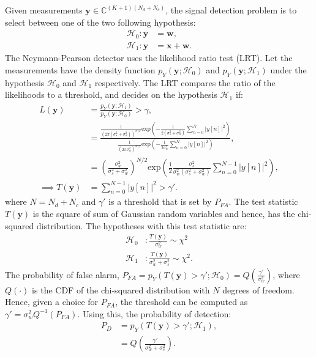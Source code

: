 \documentclass[11pt]{article}
\newcommand{\by}{\mathbf{y}}
\newcommand{\bx}{\mathbf{x}}
\newcommand{\bw}{\mathbf{w}}
\newcommand{\cc}{\mathbb{C}}
\newcommand{\cH}{\mathcal{H}}
\begin{document}
Given measurements $\by \in \cc^{(K+1)(N_{d}+N_{c})}$, the signal detection problem is to select between one of the two following hypothesis:
\begin{equation}
\begin{split}
	\mathcal{H}_{0}: \by &= \bw, \\
	\mathcal{H}_{1}: \by &= \bx + \bw.
\end{split}
\label{eq:detectionProblem}
\end{equation}
The Neymann-Pearson detector uses the likelihood ratio test (LRT). Let the measurements have the density function $p_{Y}(\by ; \cH_{0})$ and $p_{Y}(\by ; \cH_{1})$ under the hypothesis $\cH_{0}$ and $\cH_{1}$ respectively. The LRT compares the ratio of the likelihoods to a threshold, and decides on the hypothesis $\cH_{1}$ if:
\begin{equation}
\begin{split}
L(\by) &= \frac{p_{Y}(\by ; \cH_{1})}{p_{Y}(\by ; \cH_{0})} > \gamma, \\
&= \frac{\frac{1}{(2\pi(\sigma_{s}^{2} + \sigma_{w}^{2}))^{N/2}} \mathrm{exp}\left(-\frac{1}{2(\sigma_{s}^{2}+\sigma_{w}^{2})} \sum_{n=0}^{N}\vert y[n] \vert^{2} \right)}{\frac{1}{(2\pi\sigma_{w}^{2})^{N/2}} \mathrm{exp}\left(-\frac{1}{2\sigma_{w}^{2}} \sum_{n=0}^{N}\vert y[n] \vert^{2} \right)}, \\
&= \left(\frac{\sigma_{w}^{2}}{\sigma_{s}^{2}+\sigma_{w}^{2}}\right)^{N/2} \mathrm{exp} \left( \frac{1}{2} \frac{\sigma_{s}^{2}}{\sigma_{w}^{2}(\sigma_{s}^{2}+\sigma_{w}^{2})} \sum_{n=0}^{N-1} \vert y[n] \vert^{2} \right), \\
\implies T(\by) &= \sum_{n=0}^{N-1} \vert y[n] \vert^{2} > \gamma'.
\end{split}
\label{eq:energyLRT}
\end{equation}
where $N = N_{d}+N_{c}$ and $\gamma'$ is a threshold that is set by $P_{FA}$. The test statistic $T(\by)$ is the square of sum of Gaussian random variables and hence, has the chi-squared distribution. The hypotheses with this test statistic are:
\begin{equation}
\begin{split}
	\mathcal{H}_{0}&: \frac{T(\by)}{\sigma_{w}^{2}} \sim \chi^{2} \\
	\mathcal{H}_{1}&: \frac{T(\by)}{\sigma_{w}^{2} + \sigma_{s}^{2}} \sim \chi^{2}.
\end{split}
\label{eq:hypothesesEnergy}
\end{equation}
The probability of false alarm, $P_{FA} = p_{Y}(T(\by)>\gamma' ; \cH_{0}) = Q(\frac{\gamma'}{\sigma_{w}^{2}})$, where $Q(\cdot)$ is the CDF of the chi-squared distribution with $N$ degrees of freedom. Hence, given a choice for $P_{FA}$, the threshold can be computed as $\gamma' = \sigma_{w}^{2} Q^{-1}(P_{FA})$. Using this, the probability of detection:
\begin{equation}
\begin{split}
	P_{D} &= p_{Y}(T(\by)>\gamma';\cH_{1}), \\
	&= Q\left(\frac{\gamma'}{\sigma_{w}^{2} + \sigma_{s}^{2}}\right).
\end{split}
\label{eq:probDetectionEnergy}
\end{equation}
\end{document}
